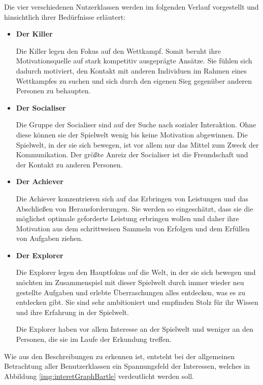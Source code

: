 \documentclass[bibliography=totoc,listof=totoc,BCOR=5mm,DIV=12,oneside]{scrbook}
\begin{document}
\par Die vier verschiedenen Nutzerklassen werden im folgenden Verlauf vorgestellt und hinsichtlich ihrer Bedürfnisse erläutert:
\begin{itemize}
\item \textbf{Der Killer}
\par Die Killer legen den Fokus auf den Wettkampf. Somit beruht ihre Motivationsquelle auf stark kompetitiv ausgeprägte Ansätze. Sie fühlen sich dadurch motiviert, den Kontakt mit anderen Individuen im Rahmen eines Wettkampfes zu suchen und sich durch den eigenen Sieg gegenüber anderen Personen zu behaupten.

\item \textbf{Der Socialiser}
\par Die Gruppe der Socialiser sind auf der Suche nach sozialer Interaktion. Ohne diese können sie der Spielwelt wenig bis keine Motivation abgewinnen. Die Spielwelt, in der sie sich bewegen, ist vor allem nur das Mittel zum Zweck der Kommunikation. Der größte Anreiz der Socialiser ist die Freundschaft und der Kontakt zu anderen Personen.

\newpage
\item \textbf{Der Achiever}
\par Die Achiever konzentrieren sich auf das Erbringen von Leistungen und das Abschließen von Herausforderungen. Sie werden so eingeschätzt, dass sie die möglichst optimale geforderte Leistung erbringen wollen und daher ihre Motivation aus dem schrittweisen Sammeln von Erfolgen und dem Erfüllen von Aufgaben ziehen.

\item \textbf{Der Explorer}
\par Die Explorer legen den Hauptfokus auf die Welt, in der sie sich bewegen und möchten im Zusammenspiel mit dieser Spielwelt durch immer wieder neu gestellte Aufgaben und erlebte Überraschungen alles entdecken, was es zu entdecken gibt. Sie sind sehr ambitioniert und empfinden Stolz für ihr Wissen und ihre Erfahrung in der Spielwelt. 
\par Die Explorer haben vor allem Interesse an der Spielwelt und weniger an den Personen, die sie im Laufe der Erkundung treffen.
\end{itemize}

\par \bigskip Wie aus den Beschreibungen zu erkennen ist, entsteht bei der allgemeinen Betrachtung aller Benutzerklassen ein Spannungsfeld der Interessen, welches in Abbildung \ref{img:interetGraphBartle} verdeutlicht werden soll.
\end{document}
